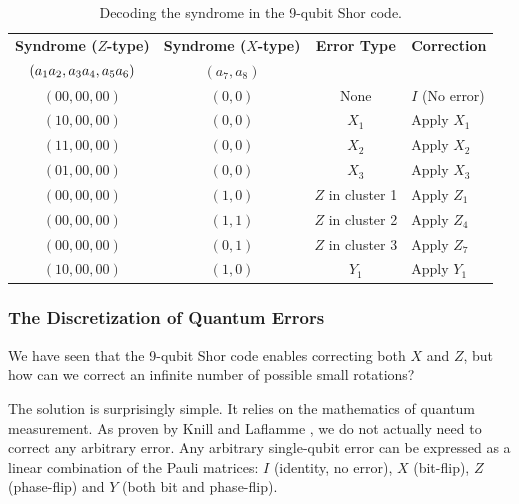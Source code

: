 \begin{table}[hbt]
    \centering
    \renewcommand{\arraystretch}{1.2}
    \begin{tabularx}{\textwidth}{@{}cccX@{}}
    \toprule
    \textbf{Syndrome ($Z$-type)} & \textbf{Syndrome ($X$-type)} & \textbf{Error Type} & \textbf{Correction} \\
    \textbf{$(a_1 a_2,\space a_3 a_4,\space a_5 a_6)$} & \textbf{$(a_7, a_8)$} &  &  \\
    \midrule
    $(00, 00, 00)$ & $(0, 0)$ & None & $I$ (No error) \\
    \midrule
    $(10, 00, 00)$ & $(0, 0)$ & $X_1$ & Apply $X_1$ \\
    $(11, 00, 00)$ & $(0, 0)$ & $X_2$ & Apply $X_2$ \\
    $(01, 00, 00)$ & $(0, 0)$ & $X_3$ & Apply $X_3$ \\
    \midrule
    $(00, 00, 00)$ & $(1, 0)$ & $Z$ in cluster 1 & Apply $Z_1$ \\
    $(00, 00, 00)$ & $(1, 1)$ & $Z$ in cluster 2 & Apply $Z_4$ \\
    $(00, 00, 00)$ & $(0, 1)$ & $Z$ in cluster 3 & Apply $Z_7$ \\
    \midrule
    $(10, 00, 00)$ & $(1, 0)$ & $Y_1$ & Apply $Y_1$ \\
    \bottomrule
    \end{tabularx}
    \caption{Decoding the syndrome in the 9-qubit Shor code.}
    \label{tab:9-shor-syndrome}
\end{table}

\subsubsection*{The Discretization of Quantum Errors}
We have seen that the 9-qubit Shor code enables correcting both $X$ and $Z$, but how can we correct an infinite number of possible small rotations? 

The solution is surprisingly simple. It relies on the mathematics of quantum measurement. As proven by Knill and Laflamme \cite{knill1997theory}, we do not actually need to correct any arbitrary error. Any arbitrary single-qubit error can be expressed as a linear combination of the Pauli matrices: $I$ (identity, no error), $X$ (bit-flip), $Z$ (phase-flip) and $Y$ (both bit and phase-flip).

